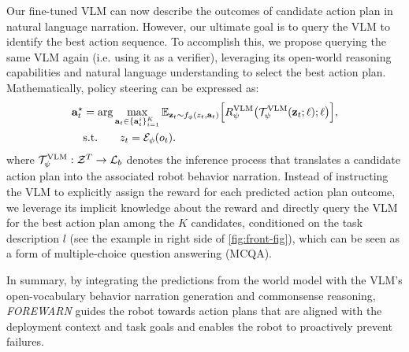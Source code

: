 Our fine-tuned VLM can now describe the outcomes of candidate action plan in natural language narration. However, our ultimate goal is to query the VLM to identify the best action sequence. To accomplish this, we propose querying the same VLM again (i.e. using it as a verifier), leveraging its open-world reasoning capabilities and natural language understanding to select the best action plan.
Mathematically, policy steering can be expressed as:
\begin{equation}
\begin{aligned}
    \mathbf{a}^{\star}_t &= \arg\max_{\mathbf{a}_t \in \{\mathbf{a}^i_t\}^K_{i=1}} \mathbb{E}_{\mathbf{z}_t \sim f_\phi(z_t, \mathbf{a}_t)} \Big[R^{\text{VLM}}_\psi \big(\mathcal{T}^{\text{VLM}}_\psi(\mathbf{z}_t; \ell); \ell \big) \Big], \\  
    & \text{s.t.} \quad\quad z_t = \mathcal{E}_\phi(o_t).
   \label{eq:vlm_reward}
    \end{aligned}
\end{equation}
where $\mathcal{T}^{\text{VLM}}_\psi : \mathcal{Z}^T \rightarrow \mathcal{L}_{b}$ denotes the inference process that translates a candidate action plan into the associated robot behavior narration. Instead of instructing the VLM to explicitly assign the reward for each predicted action plan outcome, we leverage its implicit knowledge about the reward and directly query the VLM for the best action plan among the $K$ candidates, conditioned on the task description $l$ (see the example in right side of \autoref{fig:front-fig}), which can be seen as a form of multiple-choice question answering (MCQA).

In summary, by integrating the predictions from the world model with the VLM’s open-vocabulary behavior narration generation and commonsense reasoning, \textit{FOREWARN} guides the robot towards action plans that are aligned with the deployment context and task goals and enables the robot to proactively prevent failures.  













